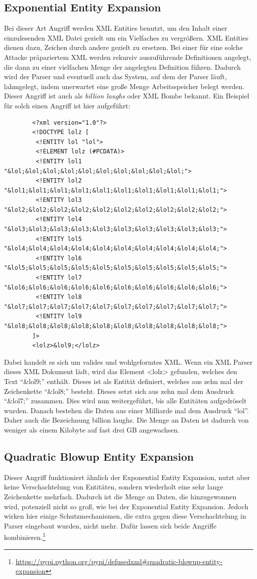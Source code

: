		\subsection{Exponential Entity Expansion}
		Bei dieser Art Angriff werden XML Entities benutzt, um den Inhalt einer
		einzulesenden XML Datei gezielt um ein Vielfaches zu vergrößern. XML Entities
		dienen dazu, Zeichen durch andere gezielt zu ersetzen. Bei einer
		für eine solche Attacke präpariertem XML werden rekursiv auszuführende
		Definitionen angelegt, die dann zu einer vielfachen Menge der angelegten
		Definition führen. Dadurch wird der Parser und eventuell auch das System, auf
		dem der Parser läuft, lahmgelegt, indem unerwartet eine große Menge
		Arbeitsspeicher belegt werden. Dieser Angriff ist auch als \textit{billion laughs} oder XML
		Bombe bekannt.\cite{Sul09} Ein Beispiel für solch einen Angriff ist hier aufgeführt:
		\begin{lstlisting}
		<?xml version="1.0"?>
		<!DOCTYPE lolz [
		 <!ENTITY lol "lol">
		 <!ELEMENT lolz (#PCDATA)>
		 <!ENTITY lol1 "&lol;&lol;&lol;&lol;&lol;&lol;&lol;&lol;&lol;&lol;">
		 <!ENTITY lol2 "&lol1;&lol1;&lol1;&lol1;&lol1;&lol1;&lol1;&lol1;&lol1;&lol1;">
		 <!ENTITY lol3 "&lol2;&lol2;&lol2;&lol2;&lol2;&lol2;&lol2;&lol2;&lol2;&lol2;">
		 <!ENTITY lol4 "&lol3;&lol3;&lol3;&lol3;&lol3;&lol3;&lol3;&lol3;&lol3;&lol3;">
		 <!ENTITY lol5 "&lol4;&lol4;&lol4;&lol4;&lol4;&lol4;&lol4;&lol4;&lol4;&lol4;">
		 <!ENTITY lol6 "&lol5;&lol5;&lol5;&lol5;&lol5;&lol5;&lol5;&lol5;&lol5;&lol5;">
		 <!ENTITY lol7 "&lol6;&lol6;&lol6;&lol6;&lol6;&lol6;&lol6;&lol6;&lol6;&lol6;">
		 <!ENTITY lol8 "&lol7;&lol7;&lol7;&lol7;&lol7;&lol7;&lol7;&lol7;&lol7;&lol7;">
		 <!ENTITY lol9 "&lol8;&lol8;&lol8;&lol8;&lol8;&lol8;&lol8;&lol8;&lol8;&lol8;">
		]>
		<lolz>&lol9;</lolz>
		\end{lstlisting}
		Dabei handelt es sich um valides und wohlgeformtes XML. Wenn ein XML Parser
		dieses XML Dokument lädt, wird das Element <lolz> gefunden, welches den Text
		“&lol9;” enthält. Dieses ist als Entität definiert, welches aus zehn mal der
		Zeichenkette “&lol8;” besteht. Dieses setzt sich aus zehn mal
		dem Ausdruck “&lol7;”  zusammen. Dies wird nun weitergeführt, bis alle
		Entitäten aufgedröselt wurden. Danach bestehen die Daten aus einer Milliarde
		mal dem Ausdruck "`lol"'. Daher auch die Bezeichnung billion laughs. Die Menge an
		Daten ist dadurch von weniger als einem Kilobyte auf fast drei GB
		angewachsen.\cite{Sul09}
		
		\subsection{Quadratic Blowup Entity Expansion}
		Dieser Angriff funktioniert ähnlich der Exponential Entity Expansion, nutzt
		aber keine Verschachtelung von Entitäten, sondern wiederholt eine sehr lange
		Zeichenkette mehrfach. Dadurch ist die Menge an Daten, die hinzugewonnen wird,
		potenziell nicht so groß, wie bei der Exponential Entity Expansion. Jedoch
		wirken hier einige Schutzmechanismen, die extra gegen diese Verschachtelung in
		Parser eingebaut wurden, nicht mehr. Dafür lassen sich beide Angriffe
		kombinieren.\footnote{\url{https://pypi.python.org/pypi/defusedxml#quadratic-blowup-entity-expansion}}
		
